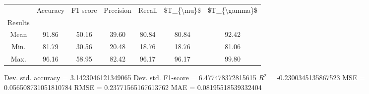 \begin{tabular}{|c|c|c|c|c|c|c|}
\toprule
{} &  Accuracy &  F1 score &  Precision &  Recall &  \$T\_\{\textbackslash mu\}\$ &  \$T\_\{\textbackslash gamma\}\$ \\
Results &           &           &            &         &            &               \\
\hline
Mean    &     91.86 &     50.16 &      39.60 &   80.84 &      80.84 &         92.42 \\
Min.    &     81.79 &     30.56 &      20.48 &   18.76 &      18.76 &         81.06 \\
Max.    &     96.16 &     58.95 &      82.42 &   96.17 &      96.17 &         99.80 \\
\bottomrule
\end{tabular}

 Dev. std. accuracy = 3.1423046121349065
 Dev. std. F1-score = 6.477478372815615
 $R^2$ = -0.2300345135867523
 MSE = 0.056508731051810784
 RMSE = 0.23771565167613762
 MAE = 0.08195518539332404